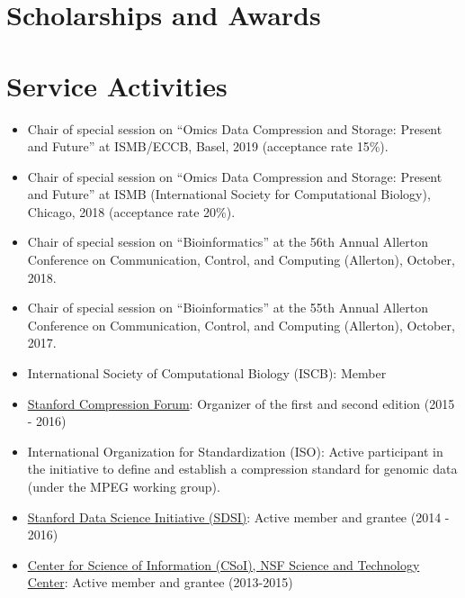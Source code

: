 \documentclass[11pt,a4paper,sans]{moderncv}        %
\begin{document}
\section{Scholarships and Awards}



\section{Service Activities}
\begin{itemize}
\item Chair of special session on ``Omics Data Compression and Storage: Present and Future'' at ISMB/ECCB, Basel, 2019 (acceptance rate 15\%).
\item Chair of special session on ``Omics Data Compression and Storage: Present and Future'' at ISMB (International Society for Computational Biology), Chicago, 2018 (acceptance rate 20\%).
\item Chair of special session on ``Bioinformatics'' at the 56th Annual Allerton Conference on Communication, Control, and Computing (Allerton), October, 2018.
\item Chair of special session on ``Bioinformatics'' at the 55th Annual Allerton Conference on Communication, Control, and Computing (Allerton), October, 2017.
\end{itemize}


\begin{itemize}
\item International Society of Computational Biology (ISCB): Member 
\item \href{https://compression.stanford.edu/}{Stanford Compression Forum}: Organizer of the first and second edition (2015 - 2016)
\item International Organization for Standardization (ISO): Active participant in the initiative to define and establish a compression standard for genomic data (under the MPEG working group).
\item \href{https://sdsi.stanford.edu/}{Stanford Data Science Initiative (SDSI)}: Active member and grantee (2014 - 2016)
\item \href{https://www.soihub.org/}{Center for Science of Information (CSoI), NSF Science and Technology Center}: Active member and grantee (2013-2015)
\end{itemize}
\vspace{5pt}
\end{document}
